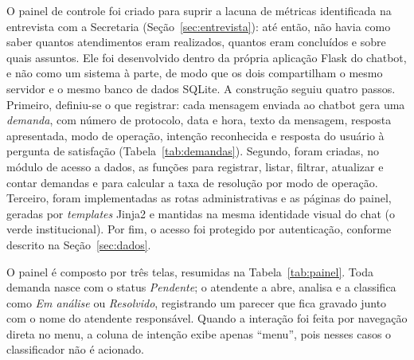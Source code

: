 \documentclass[12pt]{article}
\begin{document}
O painel de controle foi criado para suprir a lacuna de métricas identificada
na entrevista com a Secretaria (Seção~\ref{sec:entrevista}): até então, não
havia como saber quantos atendimentos eram realizados, quantos eram concluídos
e sobre quais assuntos. Ele foi desenvolvido dentro da própria aplicação Flask
do chatbot, e não como um sistema à parte, de modo que os dois compartilham o
mesmo servidor e o mesmo banco de dados SQLite. A construção seguiu quatro
passos. Primeiro, definiu-se o que registrar: cada mensagem enviada ao chatbot
gera uma \textit{demanda}, com número de protocolo, data e hora, texto da
mensagem, resposta apresentada, modo de operação, intenção reconhecida e
resposta do usuário à pergunta de satisfação (Tabela~\ref{tab:demandas}).
Segundo, foram criadas, no módulo de acesso a dados, as funções para registrar,
listar, filtrar, atualizar e contar demandas e para calcular a taxa de
resolução por modo de operação. Terceiro, foram implementadas as rotas
administrativas e as páginas do painel, geradas por \textit{templates} Jinja2 e
mantidas na mesma identidade visual do chat (o verde institucional). Por fim,
o acesso foi protegido por autenticação, conforme descrito na
Seção~\ref{sec:dados}.

O painel é composto por três telas, resumidas na Tabela~\ref{tab:painel}.
Toda demanda nasce com o status \textit{Pendente}; o atendente a abre, analisa e
a classifica como \textit{Em análise} ou \textit{Resolvido}, registrando um
parecer que fica gravado junto com o nome do atendente responsável. Quando a
interação foi feita por navegação direta no menu, a coluna de intenção exibe
apenas ``menu'', pois nesses casos o classificador não é acionado.
\end{document}
